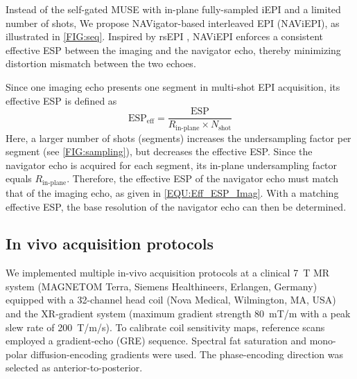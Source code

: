\documentclass[preprint,12pt,authoryear,review]{elsarticle}
\begin{document}
    Instead of the self-gated MUSE with in-plane fully-sampled iEPI
    and a limited number of shots,
    We propose NAVigator-based interleaved EPI (NAViEPI),
    as illustrated in \cref{FIG:seq}.
    Inspired by rsEPI \citep{porter_2009_resolve},
    NAViEPI enforces a consistent effective ESP
    between the imaging and the navigator echo,
    thereby minimizing distortion mismatch between the two echoes.

    Since one imaging echo presents
    one segment in multi-shot EPI acquisition,
    its effective ESP is defined as
    \begin{equation}
        \mathrm{ESP}_{\mathrm{eff}} = \frac{\mathrm{ESP}}{R_\text{in-plane} \times N_\mathrm{shot}}
        \label{EQU:Eff_ESP_Imag}
    \end{equation}
    Here, a larger number of shots (segments) increases
    the undersampling factor per segment (see \cref{FIG:sampling}),
    but decreases the effective ESP.
    Since the navigator echo is acquired for each segment,
    its in-plane undersampling factor
    equals $R_\text{in-plane}$.
    Therefore, the effective ESP of the navigator echo
    must match that of the imaging echo,
    as given in \cref{EQU:Eff_ESP_Imag}.
    With a matching effective ESP,
    the base resolution of the navigator echo
    can then be determined.

    \subsection{In vivo acquisition protocols}

    We implemented multiple in-vivo acquisition protocols
    at a clinical \SI{7}{\tesla} MR system
    (MAGNETOM Terra, Siemens Healthineers, Erlangen, Germany)
    equipped with a 32-channel head coil (Nova Medical, Wilmington, MA, USA)
    and the XR-gradient system
    (maximum gradient strength \SI{80}{\milli\tesla / \meter}
    with a peak slew rate of \SI{200}{\tesla / \meter / \second}).
    To calibrate coil sensitivity maps, reference scans employed a gradient-echo (GRE) sequence.
    Spectral fat saturation and mono-polar diffusion-encoding gradients were used.
    The phase-encoding direction was selected as anterior-to-posterior.
\end{document}

